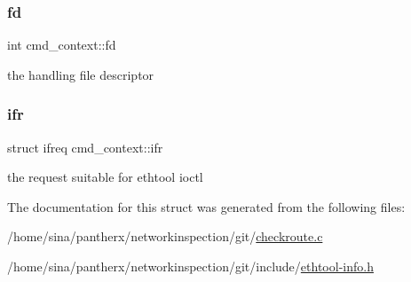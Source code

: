 \subsubsection{\texorpdfstring{fd}{fd}}
{\footnotesize\ttfamily int cmd\+\_\+context\+::fd}



the handling file descriptor 

\mbox{\label{structcmd__context_a372549b7e45b707f07780719bc9f3b06}} 
\subsubsection{\texorpdfstring{ifr}{ifr}}
{\footnotesize\ttfamily struct ifreq cmd\+\_\+context\+::ifr}



the request suitable for ethtool ioctl 



The documentation for this struct was generated from the following files\+:\begin{DoxyCompactItemize}
\item 
/home/sina/pantherx/networkinspection/git/\hyperlink{checkroute_8c}{checkroute.\+c}\item 
/home/sina/pantherx/networkinspection/git/include/\hyperlink{ethtool-info_8h}{ethtool-\/info.\+h}\end{DoxyCompactItemize}
